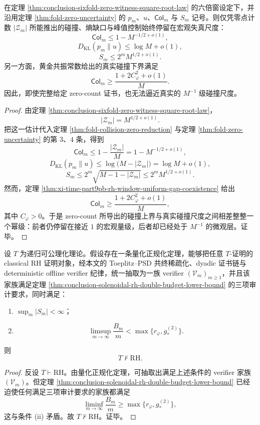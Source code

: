 \begin{theorem}[零点计数证书的碰撞盲性]\label{thm:conclusion-zero-count-collision-blindness}
在定理 \ref{thm:conclusion-sixfold-zero-witness-square-root-law} 的六倍窗设定下，并沿用定理 \ref{thm:fold-zero-uncertainty} 的 \(p_m\)、\(u\)、\(\mathsf{Col}_m\) 与 \(S_m\) 记号。则仅凭零点计数 \(|\mathcal Z_m|\) 所能推出的碰撞、熵缺口与峰值控制始终停留在宏观失真尺度：
\[
\mathsf{Col}_m\le 1-M^{-1/2+o(1)},
\]
\[
D_{\mathrm{KL}}(p_m\|u)\le \log M+o(1),
\]
\[
S_m\le 2^mM^{1/2+o(1)}.
\]
另一方面，黄金共振常数给出的真实碰撞下界满足
\[
\mathsf{Col}_m\ge \frac{1+2C_\varphi^2+o(1)}{M}.
\]
因此，即使完整给定 zero-count 证书，也无法逼近真实的 \(M^{-1}\) 级碰撞尺度。
\end{theorem}
\begin{proof}
由定理 \ref{thm:conclusion-sixfold-zero-witness-square-root-law}，
\[
|\mathcal Z_m|=M^{1/2+o(1)}.
\]
把这一估计代入定理 \ref{thm:fold-collision-zero-reduction} 与定理 \ref{thm:fold-zero-uncertainty} 的第 \(3\)、\(4\) 条，得到
\[
\mathsf{Col}_m
\le
1-\frac{|\mathcal Z_m|}{M}
=
1-M^{-1/2+o(1)},
\]
\[
D_{\mathrm{KL}}(p_m\|u)
\le
\log\!\bigl(M-|\mathcal Z_m|\bigr)
=
\log M+o(1),
\]
\[
S_m
\le
2^m\sqrt{M-1-|\mathcal Z_m|}
\le
2^mM^{1/2+o(1)}.
\]
然而，定理 \ref{thm:xi-time-part9pb-rh-window-uniform-gap-coexistence} 给出
\[
\mathsf{Col}_m
\ge
\frac{1+2C_\varphi^2+o(1)}{M},
\]
其中 \(C_\varphi>0\)。于是 zero-count 所导出的碰撞上界与真实碰撞尺度之间相差整整一个幂级：前者仍停留在接近 \(1\) 的宏观量级，后者却已经处于 \(M^{-1}\) 的微观层。证毕。
\end{proof}



\begin{theorem}\label{thm:conclusion-solenoidal-rh-quantitative-normalization-independence}
设 \(T\) 为递归可公理化理论。假设存在一条量化正规化定理，能够把任意 \(T\)-证明的 classical RH 证明对象，经本文的 Toeplitz--PSD 共终稀疏化、dyadic 证书链与 deterministic offline verifier 纪律，统一抽取为一族 verifier \((\mathcal V_m)_{m\ge 1}\)，并且该家族满足定理 \ref{thm:conclusion-solenoidal-rh-double-budget-lower-bound} 的三项审计要求，同时满足：
\begin{enumerate}
  \item[(i)] \(\sup_m |S_m|<\infty\)；
  \item[(ii)]
  \[
  \limsup_{m\to\infty}\frac{B_m}{m}
  <
  \max\!\bigl\{r_\varphi,g_*^{(2)}\bigr\}.
  \]
\end{enumerate}
则
\[
T\nvdash \mathrm{RH}.
\]
\end{theorem}
\begin{proof}
反设 \(T\vdash \mathrm{RH}\)。由量化正规化定理，可抽取出满足上述条件的 verifier 家族 \((\mathcal V_m)\)。但定理 \ref{thm:conclusion-solenoidal-rh-double-budget-lower-bound} 已经迫使任何满足三项审计要求的家族都满足
\[
\liminf_{m\to\infty}\frac{B_m}{m}\ge \max\!\bigl\{r_\varphi,g_*^{(2)}\bigr\},
\]
这与条件 (ii) 矛盾。故 \(T\nvdash \mathrm{RH}\)。证毕。
\end{proof}

